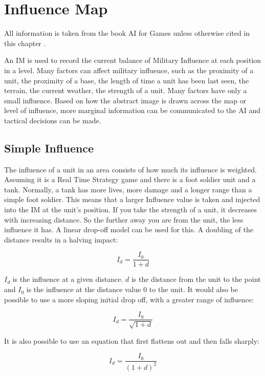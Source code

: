 \documentclass[]{report}
\begin{document}
	\section{Influence Map}
	All information is taken from the book \ac{AI} for Games unless otherwise cited in this chapter \citep{AIforGamesTactical}.
	
	An \ac{IM} is used to record the current balance of Military Influence at each position in a level. Many factors can affect military influence, such as the proximity of a unit, the proximity of a base, the length of time a unit has been last seen, the terrain, the current weather, the strength of a unit. Many factors have only a small influence. Based on how the abstract image is drawn across the map or level of influence, more marginal information can be communicated to the \ac{AI} and tactical decisions can be made. 
	
	\subsection{Simple Influence} \label{ssec:num2}
	The influence of a unit in an area consists of how much its influence is weighted. Assuming it is a Real Time Strategy game and there is a foot soldier unit and a tank. Normally, a tank has more lives, more damage and a longer range than a simple foot soldier. This means that a larger Influence value is taken and injected into the \ac{IM} at the unit's position. If you take the strength of a unit, it decreases with increasing distance. So the further away you are from the unit, the less influence it has. A linear drop-off model can be used for this. A doubling of the distance results in a halving impact:
	
	\begin{equation}
		I_{d} = \frac{I_{0}}{1 + d}
	\end{equation}

	
	$I_{d}$ is the influence at a given distance. $d$ is the distance from the unit to the point and $I_{0}$ is the influence at the distance value 0 to the unit. It would also be possible to use a more sloping initial drop off, with a greater range of influence:
	
	\begin{equation}
		I_{d} = \frac{I_{0}}{\sqrt{1 + d}}
	\end{equation}
	
	It is also possible to use an equation that first flattens out and then falls sharply: 
	
	\begin{equation}
		I_{d} = \frac{I_{0}}{(1 + d)^2}
	\end{equation}
	
\end{document}
